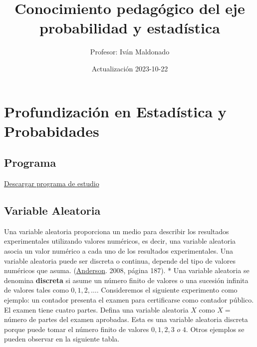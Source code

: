 \documentclass[
]{book}
\title{Conocimiento pedagógico del eje probabilidad y estadística}
\author{Profesor: Iván Maldonado}
\date{Actualización 2023-10-22}
\begin{document}
\maketitle

{
\setcounter{tocdepth}{1}
\tableofcontents
}
\hypertarget{profundizaciuxf3n-en-estaduxedstica-y-probabidades}{%
\chapter{Profundización en Estadística y Probabidades}\label{profundizaciuxf3n-en-estaduxedstica-y-probabidades}}

\hypertarget{programa}{%
\section*{Programa}\label{programa}}

\href{https://correouss-my.sharepoint.com/:b:/g/personal/imaldonadoc1_docente_uss_cl/EXfiKuJSO7JCle9L_86S0EMBeDkr3OyYHprvy0Rc0Jj4mQ?e=JcPOWy}{Descargar programa de estudio}

\hypertarget{variable-aleatoria}{%
\section{Variable Aleatoria}\label{variable-aleatoria}}

Una variable aleatoria proporciona un medio para describir los resultados experimentales utilizando valores numéricos, es decir, una variable aleatoria asocia un valor numérico a cada uno de los resultados experimentales. Una variable aleatoria puede ser discreta o continua, depende del tipo de valores numéricos que asuma. (\protect\hyperlink{ux5cux2520Referencias}{Anderson}. 2008, página 187).
* Una variable aleatoria se denomina \textbf{discreta} si asume un número finito de valores o una sucesión infinita de valores tales como \(0,1,2,\ldots\). Consideremos el siguiente experimento como ejemplo: un contador presenta el examen para certificarse como contador público. El examen tiene cuatro partes. Defina una variable aleatoria \(X\) como \(X =\) número de partes del examen aprobadas. Esta es una variable aleatoria discreta porque puede tomar el número finito de valores \(0,1,2,3\,\,o \,\, 4\).
Otros ejemplos se pueden observar en la siguiente tabla.
\end{document}
